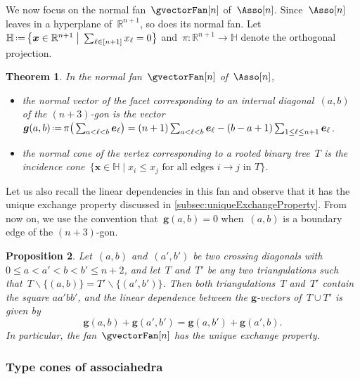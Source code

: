 \documentclass{amsart}
\newtheorem{theorem}{Theorem}[section]
\newtheorem{proposition}[theorem]{Proposition}
\theoremstyle{definition}
\newcommand{\R}{\mathbb{R}} %
\newcommand{\HH}{\mathbb{H}} %
\renewcommand{\b}[1]{{\boldsymbol{#1}}} %
\newcommand{\bigset}[2]{\big\{ #1 \;\big|\; #2 \big\}} %
\newcommand{\ssm}{\smallsetminus} %
\newcommand{\eqdef}{\mbox{\,\raisebox{0.2ex}{\scriptsize\ensuremath{\mathrm:}}\ensuremath{=}\,}} %
\newcommand{\gvector}[1]{\b{g}(#1)} %
\begin{document}
We now focus on the normal fan~$\gvectorFan[n]$ of~$\Asso[n]$.
Since~$\Asso[n]$ leaves in a hyperplane of~$\R^{n+1}$, so does its normal fan.
Let~$\HH \eqdef \bigset{\b{x} \in \R^{n+1}}{\sum_{\ell \in [n+1]} x_\ell = 0}$ and~$\pi : \R^{n+1} \to \HH$ denote the orthogonal projection.

\begin{theorem}
\label{thm:normalFanLoday}
In the normal fan~$\gvectorFan[n]$ of~$\Asso[n]$, 
\begin{itemize}
\item the normal vector of the facet corresponding to an internal diagonal~$(a,b)$ of the $(n+3)$-gon is the vector~$\gvector{a,b} \eqdef \pi\big( \sum_{a < \ell < b} \b{e}_\ell \big) = (n+1) \sum_{a < \ell < b} \b{e}_\ell - (b-a+1) \sum_{1 \le \ell \le n+1} \b{e}_\ell$.
\item the normal cone of the vertex corresponding to a rooted binary tree~$T$ is the incidence cone~$\bigset{\b{x} \in \HH}{x_i \le x_j \text{ for all edges $i \to j$ in $T$}}$.
\end{itemize}
\end{theorem}

Let us also recall the linear dependencies in this fan and observe that it has the unique exchange property discussed in \cref{subsec:uniqueExchangeProperty}.
From now on, we use the convention that~$\gvector{a,b} = 0$ when~$(a,b)$ is a boundary edge of the $(n+3)$-gon.

\begin{proposition}
\label{prop:exchangeablePairsAsso}
Let~$(a,b)$ and~$(a',b')$ be two crossing diagonals with~${0 \le a < a' < b < b' \le n+2}$, and let~$T$ and~$T'$ be any two triangulations such that~$T \ssm \{(a,b)\} = T' \ssm \{(a',b')\}$.
Then both triangulations~$T$ and~$T'$ contain the square $aa'bb'$, and the linear dependence between the $\b{g}$-vectors of~$T \cup T'$ is given by
\[
\gvector{a,b} + \gvector{a',b'} = \gvector{a,b'} + \gvector{a',b}.
\]
In particular, the fan~$\gvectorFan[n]$ has the unique exchange property.
\end{proposition}

\subsubsection{Type cones of associahedra}
\end{document}
